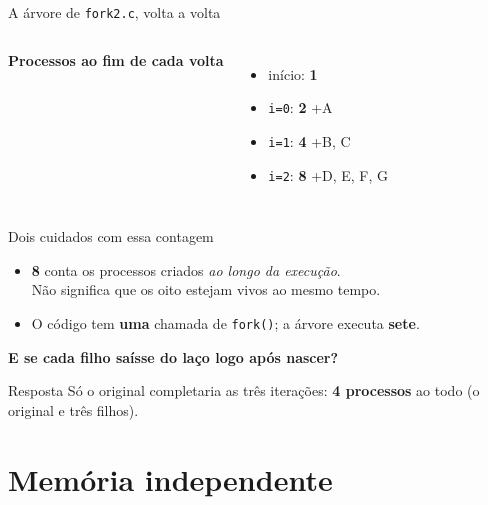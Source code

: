 \documentclass[aspectratio=169]{beamer}
\begin{document}
\begin{frame}{A árvore de \texttt{fork2.c}, volta a volta}
\begin{columns}[T]
\textbf{Processos ao fim de cada volta}
\begin{itemize}
    \item<1-> início: \textbf{1}
    \item<2-> \texttt{i=0}: \textbf{2} \hfill {\scriptsize +A}
    \item<3-> \texttt{i=1}: \textbf{4} \hfill {\scriptsize +B, C}
    \item<4-> \texttt{i=2}: \textbf{8} \hfill {\scriptsize +D, E, F, G}
\end{itemize}

\vspace{0.4em}
\small
{}%
%
%
%
\end{columns}
\end{frame}

\begin{frame}{Dois cuidados com essa contagem}
\begin{itemize}
    \item \textbf{8} conta os processos criados \emph{ao longo da execução}.\\
    Não significa que os oito estejam vivos ao mesmo tempo.
    \item O código tem \textbf{uma} chamada de \texttt{fork()}; a árvore executa \textbf{sete}.
\end{itemize}

\vspace{1em}
\textbf{E se cada filho saísse do laço logo após nascer?}

\pause
\begin{exampleblock}{Resposta}
Só o original completaria as três iterações: \textbf{4 processos} ao todo (o original e três filhos).
\end{exampleblock}
\end{frame}

\section{Memória independente}
\end{document}
